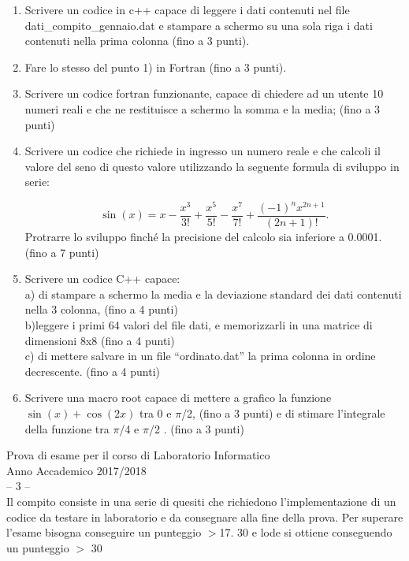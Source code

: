 \documentclass[11pt,fleqn]{book} %
\begin{document}
\begin{enumerate}
\item Scrivere un codice in c++ capace di  leggere i dati contenuti nel file  dati\_compito\_gennaio.dat e stampare a schermo su una sola riga i dati contenuti nella prima colonna (fino a 3 punti).

\item Fare lo stesso del punto 1) in Fortran (fino a 3 punti).

\item Scrivere un codice fortran funzionante, capace di chiedere ad un utente 10 numeri reali e che ne restituisce a schermo la somma e la media; (fino a 3  punti)

\item Scrivere un codice che richiede in ingresso un numero reale e che calcoli il valore del seno di questo valore utilizzando la seguente formula di sviluppo in serie:\vspace{-0.5 cm}

$$ \sin(x) =  x - \frac{x^3}{3!} + \frac{x^5}{5!} - \frac{x^7}{7!} + \frac{(-1)^{n}x^{2n+1}}{(2n+1)!}.
$$
Protrarre lo sviluppo finché la precisione del calcolo sia inferiore a 0.0001. (fino a 7 punti)  

\item Scrivere un codice C++ capace:\\
     a) di stampare a schermo la media e la deviazione standard dei dati contenuti nella 3 colonna, (fino a 4 punti) \\
     b)leggere i primi 64 valori del file dati, e memorizzarli in una matrice di dimensioni 8x8   (fino a 4 punti)\\
     c) di mettere salvare in un file “ordinato.dat” la prima colonna in ordine decrescente. (fino a 4 punti)

\item  Scrivere una macro root capace di mettere a grafico la funzione $\sin(x)+\cos(2x)$ tra 0 e $\pi$/2, (fino a 3 punti) e di stimare l’integrale della funzione tra  $\pi$/4 e $\pi$/2 . (fino a 3 punti)


\end{enumerate}



\newpage
\thispagestyle{empty}
{
\Large\centering
Prova di esame per il corso di Laboratorio Informatico\\		
Anno Accademico 2017/2018\\
-- 3 --\\
}
{
\small\centering
Il compito consiste in una serie di quesiti che richiedono l’implementazione di un codice da testare in laboratorio e da consegnare alla fine della prova. Per superare l’esame bisogna conseguire un punteggio $>$17.  
30 e lode si ottiene conseguendo un punteggio $>$ 30
}
\end{document}
